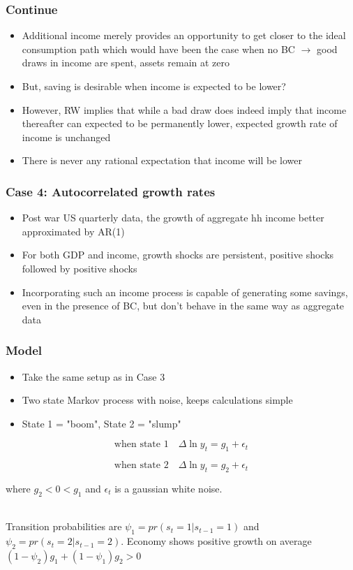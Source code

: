 \documentclass[mathserif]{beamer}
\begin{document}
\begin{frame}
\frametitle{Continue}

\begin{itemize}
    \item Additional income merely provides an opportunity to get closer to the ideal consumption path which would have been the case when no BC $\rightarrow$ good draws in income are spent, assets remain at zero
  \item But, saving is desirable when income is expected to be lower?
  \item However, RW implies that while a bad draw does indeed imply that income thereafter can expected to be permanently lower, expected growth rate of income is unchanged
  \item There is never any rational expectation that income will be lower
\end{itemize}
\end{frame}

\begin{frame}
\frametitle{Case 4: Autocorrelated growth rates}
\begin{itemize}
  \item Post war US quarterly data, the growth of aggregate hh income better approximated by AR(1)
  \item For both GDP and income, growth shocks are persistent, positive shocks followed by positive shocks
  \item Incorporating such an income process is capable of generating some savings, even in the presence of BC, but don't behave in the same way as aggregate data
\end{itemize}
\end{frame}

\begin{frame}
\frametitle{Model}
\begin{itemize}
  \item Take the same setup as in Case 3  
  \item Two state Markov process with noise, keeps calculations simple
  \item State 1 = "boom", State 2 = "slump"
\end{itemize}
\begin{equation*}
  \text{when state 1}\quad\Delta \ln y_{t} = g_{1} + \epsilon_{t}
\end{equation*}

\begin{equation*}
  \text{when state 2}\quad\Delta \ln y_{t} = g_{2} + \epsilon_{t}
\end{equation*}

where \(g_{2} < 0 < g_{1}\) and \(\epsilon_{t}\) is a gaussian white noise.\\\


Transition probabilities are \(\psi_{1} = pr(s_{t} = 1 | s_{t-1} = 1)\) and \(\psi_{2} = pr(s_{t} = 2 | s_{t-1} = 2)\). Economy shows positive growth on average \((1 - \psi_{2})g_{1} + (1 - \psi_{1})g_{2} > 0\)

\end{frame}
\end{document}
